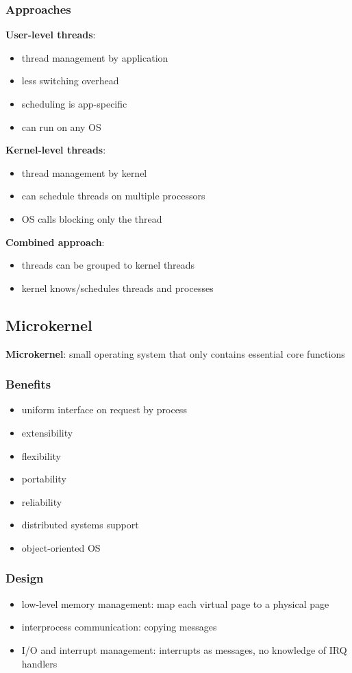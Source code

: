 \documentclass[]{article}
\theoremstyle{definition}
\begin{document}
			\subsubsection{Approaches}
				\textbf{User-level threads}:
				\begin{itemize}
					\item thread management by application
					\item less switching overhead
					\item scheduling is app-specific
					\item can run on any OS
				\end{itemize}
				\textbf{Kernel-level threads}:
				\begin{itemize}
					\item thread management by kernel
					\item can schedule threads on multiple processors
					\item OS calls blocking only the thread
				\end{itemize}
				\textbf{Combined approach}:
				\begin{itemize}
					\item threads can be grouped to kernel threads
					\item kernel knows/schedules threads and processes
				\end{itemize}
		\subsection{Microkernel}
			\textbf{Microkernel}: small operating system that only contains essential core functions
			\subsubsection{Benefits}
				\begin{itemize}
					\item uniform interface on request by process
					\item extensibility
					\item flexibility
					\item portability
					\item reliability
					\item distributed systems support
					\item object-oriented OS
				\end{itemize}
			\subsubsection{Design}
				\begin{itemize}
					\item low-level memory management: map each virtual page to a physical page
					\item interprocess communication: copying messages 
					\item I/O and interrupt management: interrupts as messages, no knowledge of IRQ handlers
				\end{itemize}
				
\end{document}
